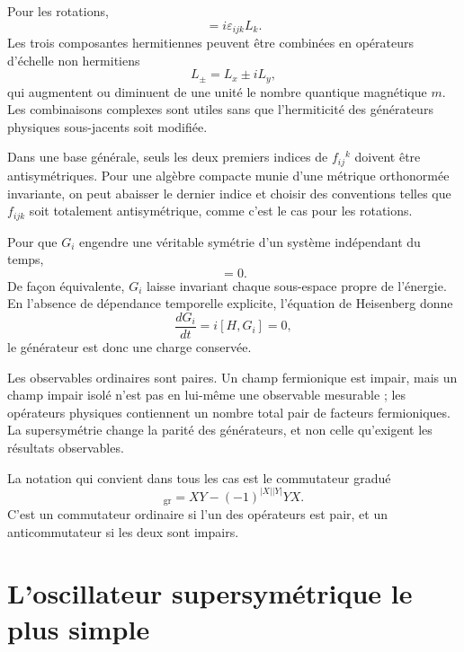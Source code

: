 Pour les rotations,
\begin{equation}
[L_i,L_j]=i\varepsilon_{ijk}L_k.
\end{equation}
Les trois composantes hermitiennes peuvent être combinées en opérateurs d’échelle non hermitiens
\begin{equation}
L_\pm=L_x\pm iL_y,
\end{equation}
qui augmentent ou diminuent de une unité le nombre quantique magnétique \(m\). Les combinaisons complexes sont utiles sans que l’hermiticité des générateurs physiques sous-jacents soit modifiée.

Dans une base générale, seuls les deux premiers indices de \(f_{ij}{}^k\) doivent être antisymétriques. Pour une algèbre compacte munie d’une métrique orthonormée invariante, on peut abaisser le dernier indice et choisir des conventions telles que \(f_{ijk}\) soit totalement antisymétrique, comme c’est le cas pour les rotations. 

Pour que \(G_i\) engendre une véritable symétrie d’un système indépendant du temps,
\begin{equation}
[H,G_i]=0.
\end{equation}
De façon équivalente, \(G_i\) laisse invariant chaque sous-espace propre de l’énergie. En l’absence de dépendance temporelle explicite, l’équation de Heisenberg donne
\begin{equation}
\frac{dG_i}{dt}=i[H,G_i]=0,
\end{equation}
le générateur est donc une charge conservée.

Les observables ordinaires sont paires. Un champ fermionique est impair, mais un champ impair isolé n’est pas en lui-même une observable mesurable ; les opérateurs physiques contiennent un nombre total pair de facteurs fermioniques. La supersymétrie change la parité des générateurs, et non celle qu’exigent les résultats observables.

La notation qui convient dans tous les cas est le commutateur gradué
\begin{equation}
[X,Y]_{\mathrm{gr}}
=XY-(-1)^{|X||Y|}YX.
\end{equation}
C’est un commutateur ordinaire si l’un des opérateurs est pair, et un anticommutateur si les deux sont impairs.

\section{L’oscillateur supersymétrique le plus simple}


